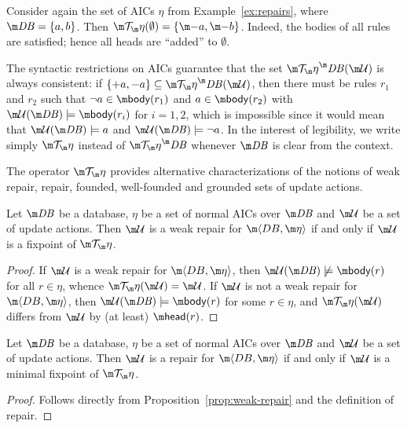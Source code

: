 
\begin{example}
  Consider again the set of AICs $\eta$ from Example~\ref{ex:repairs}, where
  $\db=\{a,b\}$.
  Then $\Op(\emptyset)=\{\remove a, \remove b\}$. Indeed, the bodies of all rules are satisfied; hence all heads are ``added'' to $\emptyset$. 
\end{example}

The syntactic restrictions on AICs guarantee that the set $\Op^\db(\UU)$ is always consistent: if $\{+a,-a\}\subseteq\Op^\db(\UU)$, then there must be rules $r_1$ and $r_2$ such that $\neg a\in\body(r_1)$ and $a\in\body(r_2)$ with $\UU(\db)\models\body(r_i)$ for $i=1,2$, which is impossible since it would mean that $\UU(\db)\models a$ and $\UU(\db)\models \lnot a$.
In the interest of legibility, we write simply $\Op$ instead of $\Op^\db$ whenever $\db$ is clear from the context.

The operator $\Op$ provides alternative characterizations of the notions of weak repair, repair, founded, well-founded and grounded sets of update actions.

\begin{proposition}
  \label{prop:weak-repair}
  Let $\db$ be a database, $\eta$ be a set of normal AICs over $\db$ and $\UU$ be a set of update actions.
  Then $\UU$ is a weak repair for $\fulldb$ if and only if $\UU$ is a fixpoint of $\Op$.
\end{proposition}
\begin{proof}
  If $\UU$ is a weak repair for $\fulldb$, then $\UU(\db)\not\models\body(r)$ for all $r\in\eta$, whence $\Op(\UU)=\UU$.
  If $\UU$ is not a weak repair for $\fulldb$, then $\UU(\db)\models\body(r)$ for some $r\in\eta$, and $\Op(\UU)$ differs from $\UU$ by (at least) $\head(r)$.
\end{proof}

\begin{proposition}
  \label{prop:repair}
  Let $\db$ be a database, $\eta$ be a set of normal AICs over $\db$ and $\UU$ be a set of update actions.
  Then $\UU$ is a repair for $\fulldb$ if and only if $\UU$ is a minimal fixpoint of $\Op$.
\end{proposition}
\begin{proof}
  Follows directly from Proposition~\ref{prop:weak-repair} and the definition of repair.
\end{proof}

